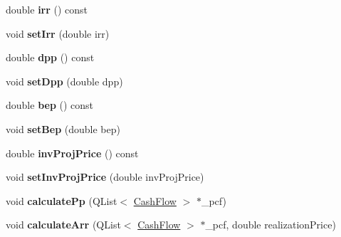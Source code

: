 \begin{DoxyCompactItemize}
\item 
\hypertarget{class_investment_project_a614b8bec172af6f0efe18f49e00e3c63}{}double {\bfseries irr} () const \label{class_investment_project_a614b8bec172af6f0efe18f49e00e3c63}

\item 
\hypertarget{class_investment_project_aa12c41f44efabdc56b6c8f0b8407351c}{}void {\bfseries set\+Irr} (double irr)\label{class_investment_project_aa12c41f44efabdc56b6c8f0b8407351c}

\item 
\hypertarget{class_investment_project_a0f72467cb543b9097c970a50eb7cb306}{}double {\bfseries dpp} () const \label{class_investment_project_a0f72467cb543b9097c970a50eb7cb306}

\item 
\hypertarget{class_investment_project_a4890760ca0c51c464fc56c20cefd87bb}{}void {\bfseries set\+Dpp} (double dpp)\label{class_investment_project_a4890760ca0c51c464fc56c20cefd87bb}

\item 
\hypertarget{class_investment_project_a06ae0ca2cbe4db2f5bb3bd1258dde66c}{}double {\bfseries bep} () const \label{class_investment_project_a06ae0ca2cbe4db2f5bb3bd1258dde66c}

\item 
\hypertarget{class_investment_project_a35d99f5669bd6251a633576eaacda228}{}void {\bfseries set\+Bep} (double bep)\label{class_investment_project_a35d99f5669bd6251a633576eaacda228}

\item 
\hypertarget{class_investment_project_a9f9408696ed9dfa40adc680c5d6035ed}{}double {\bfseries inv\+Proj\+Price} () const \label{class_investment_project_a9f9408696ed9dfa40adc680c5d6035ed}

\item 
\hypertarget{class_investment_project_a4bf4300fb6715ef0ea3fb8a1c8d87e18}{}void {\bfseries set\+Inv\+Proj\+Price} (double inv\+Proj\+Price)\label{class_investment_project_a4bf4300fb6715ef0ea3fb8a1c8d87e18}

\item 
\hypertarget{class_investment_project_abff93356ffd79f5287ce56f7b5ed37d7}{}void {\bfseries calculate\+Pp} (Q\+List$<$ \hyperlink{class_cash_flow}{Cash\+Flow} $>$ $\ast$\+\_\+pcf)\label{class_investment_project_abff93356ffd79f5287ce56f7b5ed37d7}

\item 
\hypertarget{class_investment_project_a55e8615e51e18df10c05f3a5e905b3b8}{}void {\bfseries calculate\+Arr} (Q\+List$<$ \hyperlink{class_cash_flow}{Cash\+Flow} $>$ $\ast$\+\_\+pcf, double realization\+Price)\label{class_investment_project_a55e8615e51e18df10c05f3a5e905b3b8}


\end{DoxyCompactItemize}

